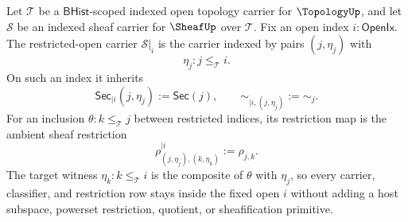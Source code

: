 \begin{definition}
\label{def:sheaf-restricted-open-carrier}
Let $\mathcal{T}$ be a $\mathsf{BHist}$-scoped indexed open topology carrier for $\TopologyUp$, and let $\mathcal{S}$ be an indexed sheaf carrier for $\SheafUp$ over $\mathcal{T}$. Fix an open index $i:\mathsf{OpenIx}$. The restricted-open carrier $\mathcal{S}|_i$ is the carrier indexed by pairs $(j,\eta_j)$ with
$$
\eta_j:j\le_{\mathcal{T}}i.
$$
On such an index it inherits
$$
\mathsf{Sec}_{|i}(j,\eta_j):=\mathsf{Sec}(j),
\qquad
\sim_{|i,(j,\eta_j)}:=\sim_j.
$$
For an inclusion $\theta:k\le_{\mathcal{T}}j$ between restricted indices, its restriction map is the ambient sheaf restriction
$$
\rho^{|i}_{(j,\eta_j),(k,\eta_k)}:=\rho_{j,k}.
$$
The target witness $\eta_k:k\le_{\mathcal{T}}i$ is the composite of $\theta$ with $\eta_j$, so every carrier, classifier, and restriction row stays inside the fixed open $i$ without adding a host subspace, powerset restriction, quotient, or sheafification primitive.
\end{definition}

